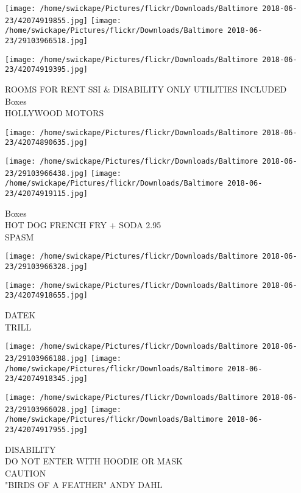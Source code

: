 \documentclass[10pt,letterpaper]{article}
\begin{document}
\texttt{[image: /home/swickape/Pictures/flickr/Downloads/Baltimore 2018-06-23/42074919855.jpg]}
\texttt{[image: /home/swickape/Pictures/flickr/Downloads/Baltimore 2018-06-23/29103966518.jpg]}

\texttt{[image: /home/swickape/Pictures/flickr/Downloads/Baltimore 2018-06-23/42074919395.jpg]}

ROOMS FOR RENT SSI \& DISABILITY ONLY UTILITIES INCLUDED\\
Boxes\\
HOLLYWOOD MOTORS\\
\pagebreak

\texttt{[image: /home/swickape/Pictures/flickr/Downloads/Baltimore 2018-06-23/42074890635.jpg]}

\vspace{0.25in}
\texttt{[image: /home/swickape/Pictures/flickr/Downloads/Baltimore 2018-06-23/29103966438.jpg]}
\texttt{[image: /home/swickape/Pictures/flickr/Downloads/Baltimore 2018-06-23/42074919115.jpg]}

Boxes\\
HOT DOG FRENCH FRY + SODA 2.95\\
SPASM\\
\pagebreak

\texttt{[image: /home/swickape/Pictures/flickr/Downloads/Baltimore 2018-06-23/29103966328.jpg]}

\vspace{0.25in}
\texttt{[image: /home/swickape/Pictures/flickr/Downloads/Baltimore 2018-06-23/42074918655.jpg]}

DATEK\\
TRILL\\
\pagebreak

\texttt{[image: /home/swickape/Pictures/flickr/Downloads/Baltimore 2018-06-23/29103966188.jpg]}
\texttt{[image: /home/swickape/Pictures/flickr/Downloads/Baltimore 2018-06-23/42074918345.jpg]}

\texttt{[image: /home/swickape/Pictures/flickr/Downloads/Baltimore 2018-06-23/29103966028.jpg]}
\texttt{[image: /home/swickape/Pictures/flickr/Downloads/Baltimore 2018-06-23/42074917955.jpg]}

DISABILITY\\
DO NOT ENTER WITH HOODIE OR MASK\\
CAUTION\\
"BIRDS OF A FEATHER" ANDY DAHL\\
\pagebreak
\end{document}
